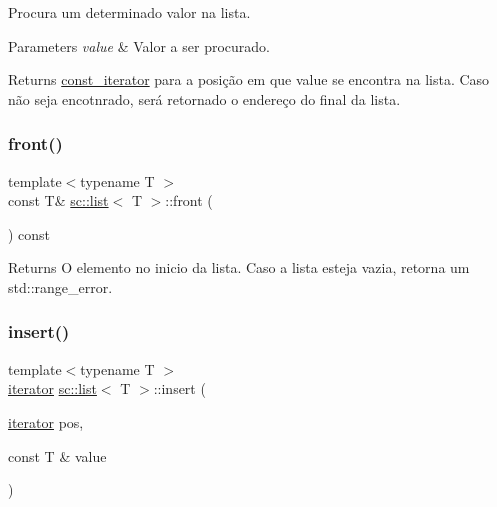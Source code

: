 Procura um determinado valor na lista. 
\begin{DoxyParams}{Parameters}
{\em value} & Valor a ser procurado. \\
\hline
\end{DoxyParams}
\begin{DoxyReturn}{Returns}
\hyperlink{classsc_1_1list_1_1const__iterator}{const\+\_\+iterator} para a posição em que value se encontra na lista. Caso não seja encotnrado, será retornado o endereço do final da lista. 
\end{DoxyReturn}
\mbox{\label{classsc_1_1list_a5e27dee267cd155aaeb87698a2f63da5}} 
\subsubsection{\texorpdfstring{front()}{front()}}
{\footnotesize\ttfamily template$<$typename T $>$ \\
const T\& \hyperlink{classsc_1_1list}{sc\+::list}$<$ T $>$\+::front (\begin{DoxyParamCaption}{ }\end{DoxyParamCaption}) const\hspace{0.3cm}{\ttfamily [inline]}}

\begin{DoxyReturn}{Returns}
O elemento no inicio da lista. Caso a lista esteja vazia, retorna um std\+::range\+\_\+error. 
\end{DoxyReturn}
\mbox{\label{classsc_1_1list_a06b47c35531035c93c34d20b39277c99}} 
\subsubsection{\texorpdfstring{insert()}{insert()}\hspace{0.1cm}{\footnotesize\ttfamily [1/6]}}
{\footnotesize\ttfamily template$<$typename T $>$ \\
\hyperlink{classsc_1_1list_1_1iterator}{iterator} \hyperlink{classsc_1_1list}{sc\+::list}$<$ T $>$\+::insert (\begin{DoxyParamCaption}\item[{\hyperlink{classsc_1_1list_1_1iterator}{iterator}}]{pos,  }\item[{const T \&}]{value }\end{DoxyParamCaption})\hspace{0.3cm}{\ttfamily [inline]}}

